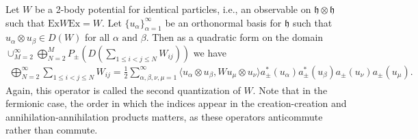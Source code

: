 \begin{theorem}\cite[p.~40]{SolNotes}
	Let $W$ be a 2-body potential for identical particles, i.e., an observable on
	$\mathfrak{h}\otimes\mathfrak{h}$ such that $\mathrm{Ex}W\mathrm{Ex}=W$. Let
	$\{u_\alpha\}_{\alpha=1}^\infty$ be an orthonormal basis for $\mathfrak{h}$ such that
	$u_\alpha\otimes u_\beta \in D(W)$ for all $\alpha\text{ and }\beta$. Then as a quadratic
	form on the domain $\cup_{M=2}^\infty\bigoplus_{N=2}^M P_\pm(D(\sum_{1\leq i<j\leq N}
	W_{ij}))$ we have
	\begin{align*}
		\bigoplus_{N=2}^\infty\sum_{1\leq i<j\leq N} W_{ij} =
		\frac{1}{2}\sum_{\alpha,\beta,\nu,\mu=1}^\infty \langle u_\alpha\otimes u_\beta, W u_\mu\otimes u_\nu \rangle
		a^*_\pm(u_\alpha)a^*_\pm(u_\beta)a_\pm(u_\nu)a_\pm(u_\mu).
	\end{align*}
	Again, this operator is called the second quantization of $W$.
	Note that in the fermionic case, the order in which the indices appear in the creation-creation
	and annihilation-annihilation products matters, as these operators anticommute rather than
	commute.
\end{theorem}
